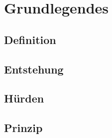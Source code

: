 \chapter{Grundlegendes}
\label{cha:grundlegendes}

\section{Definition}

\section{Entstehung}

\section{Hürden}

\section{Prinzip}
